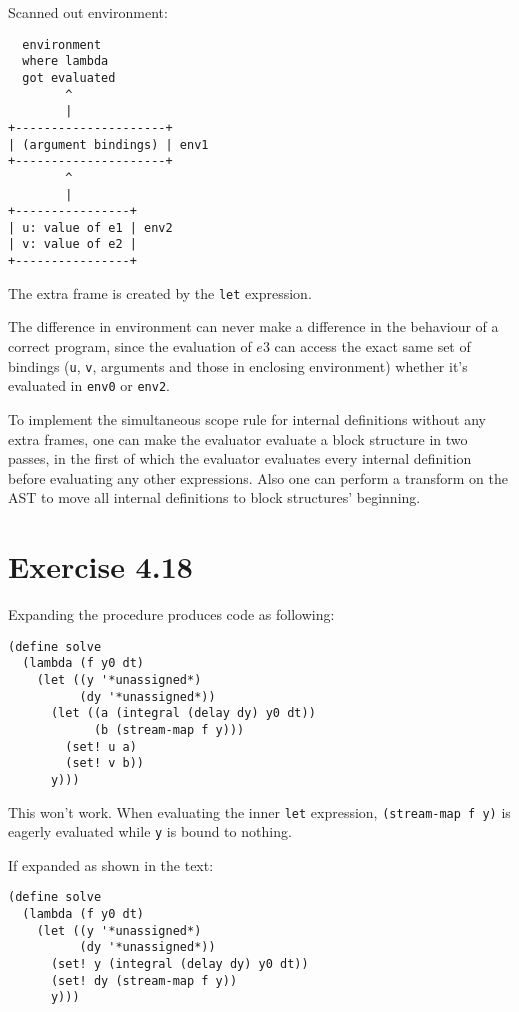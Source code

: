 \documentclass[../main.tex]{subfiles}
\begin{document}
Scanned out environment:

\begin{lstlisting}
  environment
  where lambda
  got evaluated
        ^
        |
+---------------------+
| (argument bindings) | env1
+---------------------+
        ^
        |
+----------------+
| u: value of e1 | env2
| v: value of e2 |
+----------------+
\end{lstlisting}

The extra frame is created by the \lstinline{let} expression.

The difference in environment can never make a difference in the behaviour of a correct program, since the evaluation of $e3$ can access the exact same set of bindings (\lstinline{u}, \lstinline{v}, arguments and those in enclosing environment) whether it's evaluated in \lstinline{env0} or \lstinline{env2}.

To implement the simultaneous scope rule for internal definitions without any extra frames, one can make the evaluator evaluate a block structure in two passes, in the first of which the evaluator evaluates every internal definition before evaluating any other expressions. Also one
can perform a transform on the AST to move all internal definitions to block structures' beginning.

\section{Exercise 4.18}

Expanding the procedure produces code as following:

\begin{lstlisting}
(define solve
  (lambda (f y0 dt)
    (let ((y '*unassigned*)
          (dy '*unassigned*))
      (let ((a (integral (delay dy) y0 dt))
            (b (stream-map f y)))
        (set! u a)
        (set! v b))
      y)))
\end{lstlisting}

This won't work. When evaluating the inner \lstinline{let} expression, \lstinline{(stream-map f y)} is eagerly evaluated while \lstinline{y} is bound to nothing.

If expanded as shown in the text:

\begin{lstlisting}
(define solve
  (lambda (f y0 dt)
    (let ((y '*unassigned*)
          (dy '*unassigned*))
      (set! y (integral (delay dy) y0 dt))
      (set! dy (stream-map f y))
      y)))
\end{lstlisting}
\end{document}
